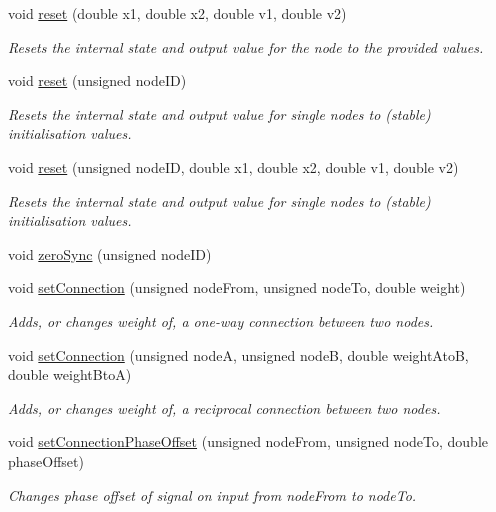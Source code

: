 \begin{DoxyCompactItemize}
void \hyperlink{classCPG_a0fcb4e728f2f647cf2af8e4a01223212}{reset} (double x1, double x2, double v1, double v2)
\begin{DoxyCompactList}\small\item\em Resets the internal state and output value for the node to the provided values. \end{DoxyCompactList}\item 
void \hyperlink{classCPG_a0582af7d0c19f80453c9ce72d918e577}{reset} (unsigned node\+ID)
\begin{DoxyCompactList}\small\item\em Resets the internal state and output value for single nodes to (stable) initialisation values. \end{DoxyCompactList}\item 
void \hyperlink{classCPG_a71a46a6aeac8fa3f1363674be5f0db81}{reset} (unsigned node\+ID, double x1, double x2, double v1, double v2)
\begin{DoxyCompactList}\small\item\em Resets the internal state and output value for single nodes to (stable) initialisation values. \end{DoxyCompactList}\item 
void \hyperlink{classCPG_adb0ab0506c07d1b7aa9dd2640c6a1731}{zero\+Sync} (unsigned node\+ID)
\item 
void \hyperlink{classCPG_ae23852907b96b57b7c45a53e9abf3146}{set\+Connection} (unsigned node\+From, unsigned node\+To, double weight)
\begin{DoxyCompactList}\small\item\em Adds, or changes weight of, a one-\/way connection between two nodes. \end{DoxyCompactList}\item 
void \hyperlink{classCPG_a4e79271993dfecd92445e9abfd4be9aa}{set\+Connection} (unsigned nodeA, unsigned nodeB, double weight\+AtoB, double weight\+BtoA)
\begin{DoxyCompactList}\small\item\em Adds, or changes weight of, a reciprocal connection between two nodes. \end{DoxyCompactList}\item 
void \hyperlink{classCPG_ac51f362e189d966e7c733ba1624d0fc1}{set\+Connection\+Phase\+Offset} (unsigned node\+From, unsigned node\+To, double phase\+Offset)
\begin{DoxyCompactList}\small\item\em Changes phase offset of signal on input from node\+From to node\+To. \end{DoxyCompactList}\item 

\end{DoxyCompactItemize}
